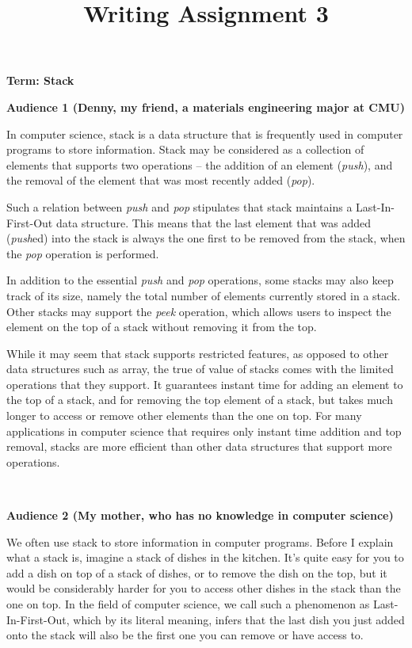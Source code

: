 \documentclass[11pt]{article}
\title{Writing Assignment 3 \\ \vspace*{.5em} \Large\mytitle}
\date{}
\newcommand{\myname}{Your name here}
\begin{document}
\clearpage\maketitle
\thispagestyle{firststyle}
\newpage
{}  
\lhead{\myname}
\rhead{\thepage}
\setlength{\voffset}{-50pt}
\setlength{\headsep}{25pt}

\par {\bf Term: Stack}
~\\
\par {\bf Audience 1 (Denny, my friend, a materials engineering major at CMU)}

In computer science, stack is a data structure that is frequently used in computer programs to store information. Stack may be considered as a collection of elements that supports two operations -- the addition of an element (\emph{push}), and the removal of the element that was most recently added (\emph{pop}).

Such a relation between \emph{push} and \emph{pop} stipulates that stack maintains a Last-In-First-Out data structure. This means that the last element that was added (\emph{push}ed) into the stack is always the one first to be removed from the stack, when the \emph{pop} operation is performed.

In addition to the essential \emph{push} and \emph{pop} operations, some stacks may also keep track of its size, namely the total number of elements currently stored in a stack. Other stacks may support the \emph{peek} operation, which allows users to inspect the element on the top of a stack without removing it from the top.

While it may seem that stack supports restricted features, as opposed to other data structures such as array, the true of value of stacks comes with the limited operations that they support. It guarantees instant time for adding an element to the top of a stack, and for removing the top element of a stack, but takes much longer to access or remove other elements than the one on top. For many applications in computer science that requires only instant time addition and top removal, stacks are more efficient than other data structures that support more operations.

~\\
\par {\bf Audience 2 (My mother, who has no knowledge in computer science)}

We often use stack to store information in computer programs. Before I explain what a stack is, imagine a stack of dishes in the kitchen. It's quite easy for you to add a dish on top of a stack of dishes, or to remove the dish on the top, but it would be considerably harder for you to access other dishes in the stack than the one on top. In the field of computer science, we call such a phenomenon as Last-In-First-Out, which by its literal meaning, infers that the last dish you just added onto the stack will also be the first one you can remove or have access to.
\end{document}
